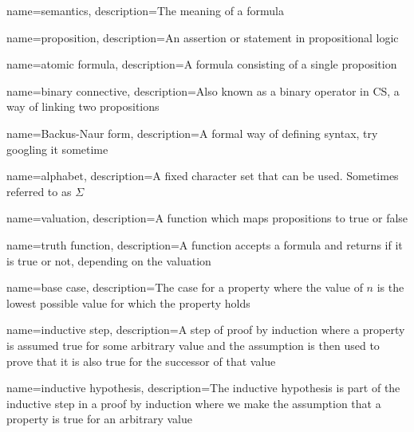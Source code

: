 {
    name={semantics},
    description={The meaning of a formula}
}

{
    name={proposition},
    description={An assertion or statement in propositional logic}
}

{
    name={atomic formula},
    description={A formula consisting of a single proposition}
}

{
    name={binary connective},
    description={Also known as a binary operator in CS, a way of linking two propositions}
}

{
    name={Backus-Naur form},
    description={A formal way of defining syntax, try googling it sometime}
}

{
    name={alphabet},
    description={A fixed character set that can be used. Sometimes referred to as $\Sigma$}
}

{
    name={valuation},
    description={A function which maps propositions to true or false}
}

{
    name={truth function},
    description={A function accepts a formula and returns if it is true or not, depending on the valuation}
}

{
    name={base case},
    description={The case for a property where the value of $n$ is the lowest possible value for which the property holds}
}

{
    name={inductive step},
    description={A step of proof by induction where a property is assumed true for some arbitrary value and the assumption is then used to prove that it is also true for the successor of that value}
}

{
    name={inductive hypothesis},
    description={The inductive hypothesis is part of the inductive step in a proof by induction where we make the assumption that a property is true for an arbitrary value}
}
